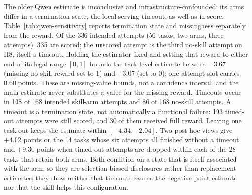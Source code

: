 \documentclass[11pt]{article}
\begin{document}
The older Qwen estimate is inconclusive and infrastructure-confounded: its arms differ in a termination state, the local-serving timeout, as well as in score. Table~\ref{tab:qwen-sensitivity} reports termination state and missingness separately from the reward. Of the 336 intended attempts (56 tasks, two arms, three attempts), 335 are scored; the unscored attempt is the third no-skill attempt on H8, itself a timeout. Holding the estimator fixed and setting that reward to either end of its legal range $[0,1]$ bounds the task-level estimate between $-3.67$ (missing no-skill reward set to 1) and $-3.07$ (set to 0); one attempt slot carries 0.60 points. These are missing-value bounds, not a confidence interval, and the main estimate never substitutes a value for the missing reward. Timeouts occur in 108 of 168 intended skill-arm attempts and 86 of 168 no-skill attempts. A timeout is a termination state, not automatically a functional failure: 193 timed-out attempts were still scored, and 30 of them received full reward. Leaving one task out keeps the estimate within $[-4.34, -2.04]$. Two post-hoc views give $+4.02$ points on the 14 tasks whose six attempts all finished without a timeout and $+9.30$ points when timed-out attempts are dropped within each of the 28 tasks that retain both arms. Both condition on a state that is itself associated with the arm, so they are selection-biased disclosures rather than replacement estimates; they show neither that timeouts caused the negative point estimate nor that the skill helps this configuration.


\end{document}
